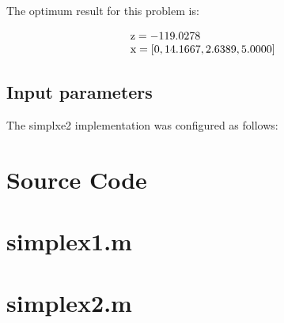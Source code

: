 \documentclass{article}
\begin{document}
The optimum result for this problem is:

\begin{equation*}
\begin{array}{ll@{}ll}
\text z = -119.0278 &\\
\text x = [0, 14.1667, 2.6389, 5.0000] &\\
\end{array}
\end{equation*}

\subsection{Input parameters}

The simplxe2 implementation was configured as follows:



\section{Source Code}
\section*{simplex1.m}


\section*{simplex2.m}

\end{document}
